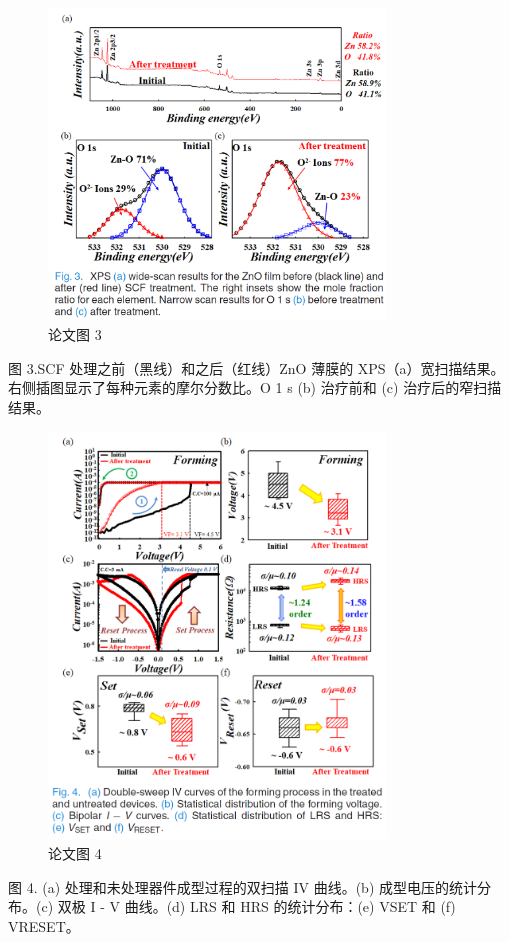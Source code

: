 \begin{figure}[htb]
\centering 
\includegraphics[width=0.80\textwidth]{img/c1m3.png} 
\caption{论文图 3}
\label{Test}
\end{figure}

图 3.SCF 处理之前（黑线）和之后（红线）ZnO 薄膜的 XPS（a）宽扫描结果。右侧插图显示了每种元素的摩尔分数比。O 1 s (b) 治疗前和 (c) 治疗后的窄扫描结果。



\begin{figure}[htb]
\centering 
\includegraphics[width=0.80\textwidth]{img/c1m4.png} 
\caption{论文图 4}
\label{Test}
\end{figure}
图 4. (a) 处理和未处理器件成型过程的双扫描 IV 曲线。(b) 成型电压的统计分布。(c) 双极 I - V 曲线。(d) LRS 和 HRS 的统计分布：(e) VSET 和 (f) VRESET。

